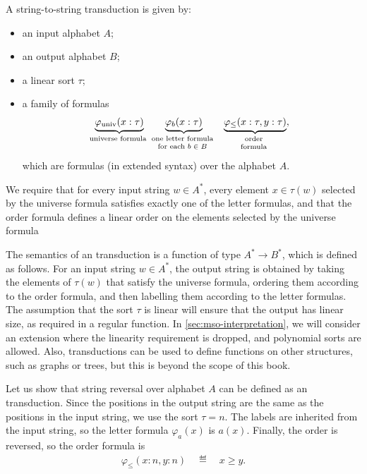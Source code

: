\begin{definition}\label{def:mso-transduction}
    A string-to-string \mso transduction is given by: 
\begin{itemize}
    \item an input alphabet $A$;
    \item an output alphabet $B$;
    \item a  linear sort $\tau$;
    \item a family of  formulas 
    \begin{align*}
        \myunderbrace{\varphi_{\text{univ}}(x : \tau)}{universe formula}
        \qquad
        \myunderbrace{\varphi_b(x : \tau)}{one letter formula   \\  for each $b \in B$} 
        \qquad 
        \myunderbrace{\varphi_{\leq}(x : \tau, y : \tau)}{order \\ formula},
    \end{align*}
    which are \mso formulas (in extended syntax) over the alphabet $A$.
\end{itemize}
We require that for every input string $w \in A^*$, every element $x \in \tau(w)$ selected by the universe formula satisfies exactly one of the letter formulas, and that the order formula defines a linear order on the  elements selected by the universe formula
\end{definition}

The semantics of an \mso transduction is a function of type $A^* \to B^*$, which is defined as follows. For an input string $w \in A^*$, the output string is obtained by taking the elements of $\tau(w)$ that satisfy the universe formula, ordering them according to the order formula, and then labelling them according to the letter formulas. The assumption that the sort $\tau$ is linear will ensure that the output has linear size, as required in a regular function. In \cref{sec:mso-interpretation},  we will consider an extension where the linearity requirement is dropped, and polynomial sorts are allowed. Also, \mso transductions can be used to define functions on other structures, such as graphs or trees, but this is beyond the scope of this book.

\begin{myexample}
   Let us show that string reversal over alphabet $ A$ can be defined as an \mso transduction. Since the positions in the output string are the same as the positions in the input string, we use the sort $\tau = n$. The labels are inherited from the input string, so the letter formula $\varphi_a(x)$ is $a(x)$. Finally, the order is reversed, so the order formula is 
   \begin{align*}
   \varphi_{\leq}(x : n ,y : n) \quad \eqdef \quad x \geq y.
   \end{align*}
\end{myexample}

